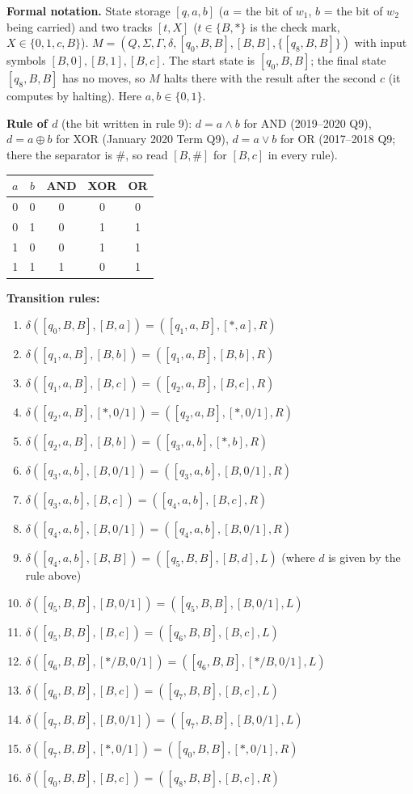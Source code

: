 \documentclass[11pt,a4paper]{article}
\begin{document}
\begin{solution}
\textbf{Formal notation.} State storage $[q,a,b]$ ($a$ = the bit of $w_1$, $b$ = the bit of $w_2$ being carried) and two tracks $[t,X]$ ($t\in\{B,\ast\}$ is the check mark, $X\in\{0,1,c,B\}$). $M=(Q,\Sigma,\Gamma,\delta,[q_0,B,B],[B,B],\{[q_8,B,B]\})$ with input symbols $[B,0],[B,1],[B,c]$. The start state is $[q_0,B,B]$; the final state $[q_8,B,B]$ has no moves, so $M$ halts there with the result after the second $c$ (it computes by halting). Here $a,b\in\{0,1\}$.

\textbf{Rule of $d$} (the bit written in rule 9): $d=a\wedge b$ for AND (2019--2020 Q9), $d=a\oplus b$ for XOR (January 2020 Term Q9), $d=a\vee b$ for OR (2017--2018 Q9; there the separator is $\#$, so read $[B,\#]$ for $[B,c]$ in every rule).
\begin{center}\small\begin{tabular}{cc|ccc}\toprule $a$&$b$& AND & XOR & OR\\\midrule 0&0&0&0&0\\0&1&0&1&1\\1&0&0&1&1\\1&1&1&0&1\\\bottomrule\end{tabular}\end{center}
\par\noindent\textbf{Transition rules:}
{\small\begin{enumerate}[label=\arabic*.,itemsep=0pt]
\item $\delta([q_0,B,B],[B,a])=([q_1,a,B],[\ast,a],R)$
\item $\delta([q_1,a,B],[B,b])=([q_1,a,B],[B,b],R)$
\item $\delta([q_1,a,B],[B,c])=([q_2,a,B],[B,c],R)$
\item $\delta([q_2,a,B],[\ast,0/1])=([q_2,a,B],[\ast,0/1],R)$
\item $\delta([q_2,a,B],[B,b])=([q_3,a,b],[\ast,b],R)$
\item $\delta([q_3,a,b],[B,0/1])=([q_3,a,b],[B,0/1],R)$
\item $\delta([q_3,a,b],[B,c])=([q_4,a,b],[B,c],R)$
\item $\delta([q_4,a,b],[B,0/1])=([q_4,a,b],[B,0/1],R)$
\item $\delta([q_4,a,b],[B,B])=([q_5,B,B],[B,d],L)$ \quad (where $d$ is given by the rule above)
\item $\delta([q_5,B,B],[B,0/1])=([q_5,B,B],[B,0/1],L)$
\item $\delta([q_5,B,B],[B,c])=([q_6,B,B],[B,c],L)$
\item $\delta([q_6,B,B],[\ast/B,0/1])=([q_6,B,B],[\ast/B,0/1],L)$
\item $\delta([q_6,B,B],[B,c])=([q_7,B,B],[B,c],L)$
\item $\delta([q_7,B,B],[B,0/1])=([q_7,B,B],[B,0/1],L)$
\item $\delta([q_7,B,B],[\ast,0/1])=([q_0,B,B],[\ast,0/1],R)$
\item $\delta([q_0,B,B],[B,c])=([q_8,B,B],[B,c],R)$
\end{enumerate}}
\end{solution}
\end{document}
